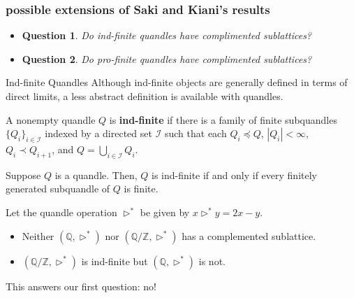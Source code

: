 \documentclass[10pt]{beamer}
\newcommand{\Z}{\mathbb{Z}}
\newcommand{\Q}{\mathbb{Q}}
\newcommand{\cI}{\mathcal{I}}
\newcommand{\sq}{\preccurlyeq} %
\newcommand{\thru}{\rhd} %
\newcommand{\psq}{\prec} %
\theoremstyle{plain}
\newtheorem{question}{Question}
\begin{document}
\begin{frame}
    \frametitle{possible extensions of Saki and Kiani's results}

    \begin{itemize}
        \item 
        \begin{question}
            Do ind-finite quandles have complimented sublattices?
        \end{question}
        \pause
        \item 
        \begin{question}
            Do pro-finite quandles have complimented sublattices?
        \end{question}

    \end{itemize}
\end{frame}
    
\begin{frame}{Ind-finite Quandles}
    Although ind-finite objects are generally defined in terms of direct limits, a less abstract definition is available with quandles.
    \begin{definition}
    A nonempty quandle $Q$ is \textbf{ind-finite} if there is a family of finite subquandles $\{Q_i\}_{i \in \cI}$ indexed by a directed set $\cI$ such that each $Q_i\sq Q$, $|Q_i|<\infty$, $Q_i\psq Q_{i+1}$, and $Q=\bigcup_{i\in\cI} Q_i.$ 
    \end{definition}    
    \pause
    
    \begin{lemma}
    Suppose $Q$ is a quandle. Then, $Q$ is ind-finite if and only if every finitely generated subquandle of $Q$ is finite.
    \end{lemma}
    \pause
    
    \begin{example}
    Let the quandle operation $\thru^*$ be given by $x\thru^* y = 2x-y$.\\
    \begin{itemize}
    \item Neither $(\Q,\thru^*)$ nor $(\Q/\Z,\thru^*)$ has a complemented sublattice.
    \item $(\Q / \Z, \thru^*)$ is ind-finite but $(\Q, \thru^*)$ is not.
    \end{itemize}
    \end{example}

    This answers our first question: no!
\end{frame}
    
\end{document}
